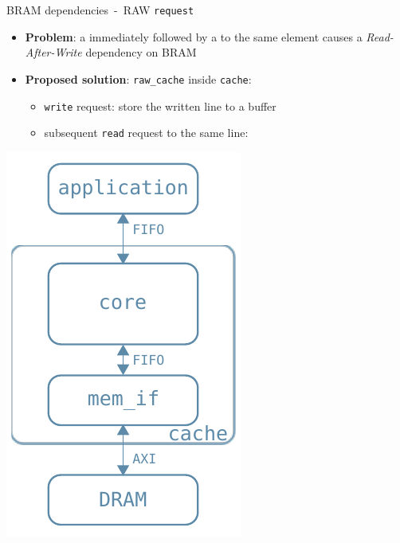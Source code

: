 \documentclass[handout,aspectratio=169]{beamer}
\begin{document}
\begin{frame}{BRAM dependencies~-~RAW \texttt{request}}
	\begin{minipage}{.7\textwidth}
		\begin{itemize}[<+->]
			\item \textbf{Problem}:
				a  immediately
				followed by a 
				to the same element causes a \emph{Read-After-Write}
				dependency on BRAM
			\item \textbf{Proposed solution}:
				\texttt{raw\_cache} inside \texttt{cache}:
				\begin{itemize}[<.->]
					\item \texttt{write} request: store the
						written line to a buffer
					\item subsequent \texttt{read} request to
						the same line: 
				\end{itemize}
		\end{itemize}
	\end{minipage}
	\begin{minipage}{.28\textwidth}
		\begin{center}
			\includegraphics[width=.8\textwidth]{internal_arch.pdf}
		\end{center}
	\end{minipage}
\end{frame}
\end{document}
